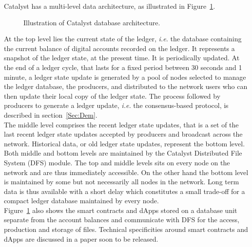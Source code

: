  Catalyst has a multi-level data architecture, as illustrated in Figure~\ref{fig:db}. 

\begin{figure}[H]
\label{fig:db}
\caption{\label{fig:db} Illustration of Catalyst database architecture.}
\end{figure}

At the top level lies the current state of the ledger, \textit{i.e.} the database containing the current balance of digital accounts recorded on the ledger. It represents a snapshot of the ledger state, at the present time. It is periodically updated. At the end of a ledger cycle, that lasts for a fixed period between 30 seconds and 1 minute, a ledger state update is generated by a pool of nodes selected to manage the ledger database, the producers, and distributed to the network users who can then update their local copy of the ledger state. The process followed by producers to generate a ledger update, \textit{i.e.} the consensus-based protocol, is described in section~\ref{Sec:Dem}.\\

The middle level comprises the recent ledger state updates, that is a set of the last recent ledger state updates accepted by producers and broadcast across the network. Historical data, or old ledger state updates, represent the bottom level. Both middle and bottom levels are maintained by the Catalyst Distributed File System (DFS) module. The top and middle levels sits on every node on the network and are thus immediately accessible. On the other hand the bottom level is maintained by some but not necessarily all nodes in the network. Long term data is thus available with a short delay which constitutes a small trade-off for a compact ledger database maintained by every node.\\

Figure~\ref{fig:db} also shows the smart contracts and dApps stored on a database unit separate from the account balances and communicate with DFS for the access, production and storage of files. Technical specificities around smart contracts and dApps are discussed in a paper soon to be released.

